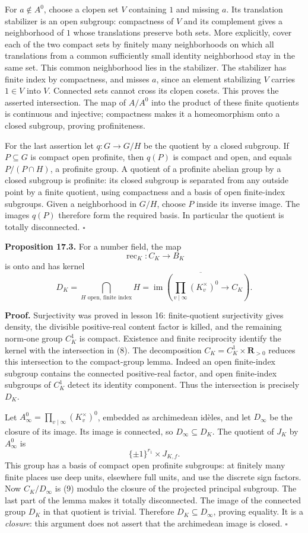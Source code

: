 \documentclass[11pt,a4paper]{article}
\begin{document}
For \(a\notin A^0\), choose a clopen set \(V\) containing \(1\) and
missing \(a\). Its translation stabilizer is an open subgroup:
compactness of \(V\) and its complement gives a neighborhood of \(1\)
whose translations preserve both sets. More explicitly, cover each of
the two compact sets by finitely many neighborhoods on which all
translations from a common sufficiently small identity neighborhood stay
in the same set. This common neighborhood lies in the stabilizer. The
stabilizer has finite index by compactness, and misses \(a\), since an
element stabilizing \(V\) carries \(1\in V\) into \(V\). Connected sets
cannot cross its clopen cosets. This proves the asserted intersection.
The map of \(A/A^0\) into the product of these finite quotients is
continuous and injective; compactness makes it a homeomorphism onto a
closed subgroup, proving profiniteness.

For the last assertion let \(q:G\to G/H\) be the quotient by a closed
subgroup. If \(P\subseteq G\) is compact open profinite, then \(q(P)\)
is compact and open, and equals \(P/(P\cap H)\), a profinite group. A
quotient of a profinite abelian group by a closed subgroup is profinite:
its closed subgroup is separated from any outside point by a finite
quotient, using compactness and a basis of open finite-index subgroups.
Given a neighborhood in \(G/H\), choose \(P\) inside its inverse image.
The images \(q(P)\) therefore form the required basis. In particular the
quotient is totally disconnected. \(\square\)

\textbf{Proposition 17.3.} For a number field, the map \[
\operatorname{rec}_K:C_K\longrightarrow B_K
\] is onto and has kernel \[
D_K=\bigcap_{H\text{ open, finite index}}H
=\overline{\operatorname{im}\left(\prod_{v\mid\infty}(K_v^\times)^0\longrightarrow C_K\right)}.
\tag{8}
\]

\textbf{Proof.} Surjectivity was proved in lesson 16: finite-quotient
surjectivity gives density, the divisible positive-real content factor
is killed, and the remaining norm-one group \(C_K^1\) is compact.
Existence and finite reciprocity identify the kernel with the
intersection in (8). The decomposition \(C_K=C_K^1\times\mathbf R_{>0}\)
reduces this intersection to the compact-group lemma. Indeed an open
finite-index subgroup contains the connected positive-real factor, and
open finite-index subgroups of \(C_K^1\) detect its identity component.
Thus the intersection is precisely \(D_K\).

Let \(A_\infty^0=\prod_{v\mid\infty}(K_v^\times)^0\), embedded as
archimedean idèles, and let \(D_\infty\) be the closure of its image.
Its image is connected, so \(D_\infty\subseteq D_K\). The quotient of
\(J_K\) by \(A_\infty^0\) is \[
\{\pm1\}^{r_1}\times J_{K,f}.
\tag{9}
\] This group has a basis of compact open profinite subgroups: at
finitely many finite places use deep units, elsewhere full units, and
use the discrete sign factors. Now \(C_K/D_\infty\) is (9) modulo the
closure of the projected principal subgroup. The last part of the lemma
makes it totally disconnected. The image of the connected group \(D_K\)
in that quotient is trivial. Therefore \(D_K\subseteq D_\infty\),
proving equality. It is a \emph{closure}: this argument does not assert
that the archimedean image is closed. \(\square\)
\end{document}
